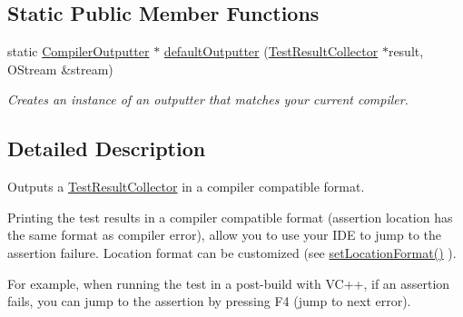 \subsection*{Static Public Member Functions}
\begin{DoxyCompactItemize}
\item 
static \hyperlink{class_compiler_outputter}{Compiler\-Outputter} $\ast$ \hyperlink{class_compiler_outputter_aa0f8f9b1fb25fe8873b7454f91dcc929}{default\-Outputter} (\hyperlink{class_test_result_collector}{Test\-Result\-Collector} $\ast$result, O\-Stream \&stream)
\begin{DoxyCompactList}\small\item\em Creates an instance of an outputter that matches your current compiler. \end{DoxyCompactList}\end{DoxyCompactItemize}


\subsection{Detailed Description}
Outputs a \hyperlink{class_test_result_collector}{Test\-Result\-Collector} in a compiler compatible format.

Printing the test results in a compiler compatible format (assertion location has the same format as compiler error), allow you to use your I\-D\-E to jump to the assertion failure. Location format can be customized (see \hyperlink{class_compiler_outputter_a0d9e67c7bdcb443b0b2754d61a10790c}{set\-Location\-Format()} ). 

For example, when running the test in a post-\/build with V\-C++, if an assertion fails, you can jump to the assertion by pressing F4 (jump to next error).

